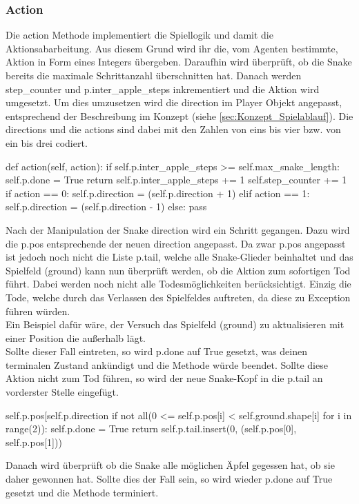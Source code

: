 \subsubsection{Action}
Die action Methode implementiert die Spiellogik und damit die Aktionsabarbeitung. Aus diesem Grund wird ihr die, vom Agenten bestimmte, Aktion in Form eines Integers übergeben. Daraufhin wird überprüft, ob die Snake bereits die maximale Schrittanzahl überschnitten hat. Danach werden step\_counter und p.inter\_apple\_steps inkrementiert und die Aktion wird umgesetzt. Um dies umzusetzen wird die direction im Player Objekt angepasst, entsprechend der Beschreibung im Konzept (siehe \ref{sec:Konzept_Spielablauf}). Die directions und die actions sind dabei mit den Zahlen von eins bis vier bzw. von ein bis drei codiert.
\begin{python}
	def action(self, action):
		if self.p.inter_apple_steps >= self.max_snake_length:
			self.p.done = True
			return
		self.p.inter_apple_steps += 1
		self.step_counter += 1
		if action == 0:
			self.p.direction = (self.p.direction + 1) %
		elif action == 1:
			self.p.direction = (self.p.direction - 1) %
		else:
			pass
\end{python}
Nach der Manipulation der Snake direction wird ein Schritt gegangen. Dazu wird die p.pos entsprechende der neuen direction angepasst. Da zwar p.pos angepasst ist jedoch noch nicht die Liste p.tail, welche alle Snake-Glieder beinhaltet und das Spielfeld (ground) kann nun überprüft werden, ob die Aktion zum sofortigen Tod führt. Dabei werden noch nicht alle Todesmöglichkeiten berücksichtigt. Einzig die Tode, welche durch das Verlassen des Spielfeldes auftreten, da diese zu Exception führen würden.\\ 
Ein Beispiel dafür wäre, der Versuch das Spielfeld (ground) zu aktualisieren mit einer Position die außerhalb lägt.\\
Sollte dieser Fall eintreten, so wird p.done auf True gesetzt, was deinen terminalen Zustand ankündigt und die Methode würde beendet. Sollte diese Aktion nicht zum Tod führen, so wird der neue Snake-Kopf in die p.tail an vorderster Stelle eingefügt.
\begin{python}
	self.p.pos[self.p.direction %
	if not all(0 <= self.p.pos[i] < self.ground.shape[i] for i in range(2)):
		self.p.done = True
		return
	self.p.tail.insert(0, (self.p.pos[0], self.p.pos[1]))
\end{python}
Danach wird überprüft ob die Snake alle möglichen Äpfel gegessen hat, ob sie daher gewonnen hat. Sollte dies der Fall sein, so wird wieder p.done auf True gesetzt und die Methode terminiert.
